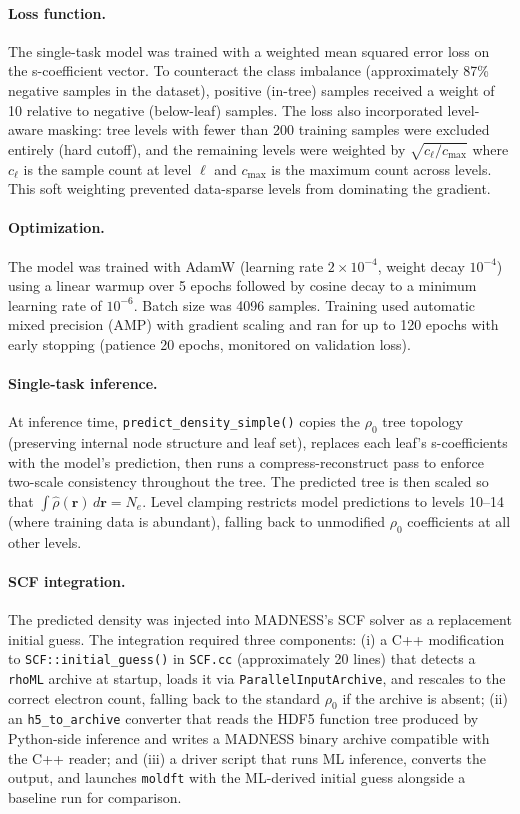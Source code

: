 \paragraph{Loss function.}
The single-task model was trained with a weighted mean squared error loss on the s-coefficient vector. To counteract the class imbalance (approximately 87\% negative samples in the dataset), positive (in-tree) samples received a weight of 10 relative to negative (below-leaf) samples. The loss also incorporated level-aware masking: tree levels with fewer than 200 training samples were excluded entirely (hard cutoff), and the remaining levels were weighted by $\sqrt{c_\ell / c_\mathrm{max}}$ where $c_\ell$ is the sample count at level $\ell$ and $c_\mathrm{max}$ is the maximum count across levels. This soft weighting prevented data-sparse levels from dominating the gradient.

\paragraph{Optimization.}
The model was trained with AdamW (learning rate $2 \times 10^{-4}$, weight decay $10^{-4}$) using a linear warmup over 5 epochs followed by cosine decay to a minimum learning rate of $10^{-6}$. Batch size was 4096 samples. Training used automatic mixed precision (AMP) with gradient scaling and ran for up to 120 epochs with early stopping (patience 20 epochs, monitored on validation loss).

\paragraph{Single-task inference.}
At inference time, \texttt{predict\_density\_simple()} copies the $\rho_0$ tree topology (preserving internal node structure and leaf set), replaces each leaf's s-coefficients with the model's prediction, then runs a compress-reconstruct pass to enforce two-scale consistency throughout the tree. The predicted tree is then scaled so that $\int \hat{\rho}(\mathbf{r})\,d\mathbf{r} = N_e$. Level clamping restricts model predictions to levels 10--14 (where training data is abundant), falling back to unmodified $\rho_0$ coefficients at all other levels.

\paragraph{SCF integration.}
The predicted density was injected into MADNESS's SCF solver as a replacement initial guess. The integration required three components: (i) a C++ modification to \texttt{SCF::initial\_guess()} in \texttt{SCF.cc} (approximately 20 lines) that detects a \texttt{rhoML} archive at startup, loads it via \texttt{ParallelInputArchive}, and rescales to the correct electron count, falling back to the standard $\rho_0$ if the archive is absent; (ii) an \texttt{h5\_to\_archive} converter that reads the HDF5 function tree produced by Python-side inference and writes a MADNESS binary archive compatible with the C++ reader; and (iii) a driver script that runs ML inference, converts the output, and launches \texttt{moldft} with the ML-derived initial guess alongside a baseline run for comparison.
